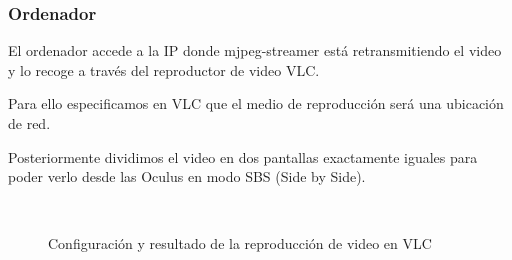 \documentclass[twoside, 12pt]{epstfg}
\begin{document}
\newpage
\subsubsection{Ordenador}
El ordenador accede a la IP donde mjpeg-streamer está retransmitiendo el video y lo recoge a través del reproductor de video VLC.

Para ello especificamos en VLC que el medio de reproducción será una ubicación de red.

Posteriormente dividimos el video en dos pantallas exactamente iguales para poder verlo desde las Oculus en modo SBS (Side by Side).

\begin{figure}[h]
	\centering
	\\
		\caption{Configuración y resultado de la reproducción de video en VLC} \label{figstream}
\end{figure}
\end{document}
